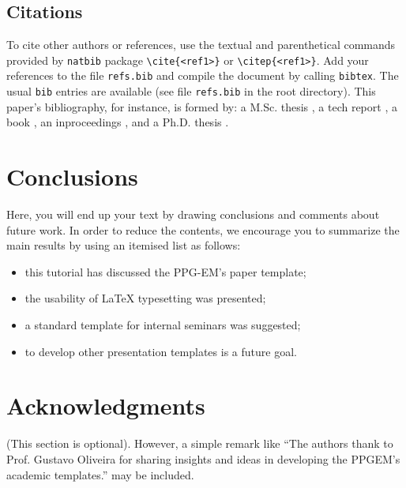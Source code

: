 \documentclass[date]{ppgem}
\begin{document}
\begin{multicols}{2}
\subsection{Citations}

To cite other authors or references, use the textual and parenthetical commands provided by \verb|natbib| package 
\verb|\cite{<ref1>}| or \verb|\citep{<ref1>}|. Add your references to the file \verb|refs.bib| and compile the document by calling \verb|bibtex|.
The usual \verb|bib| entries are available (see file \verb|refs.bib| in the root directory). This paper's bibliography, for instance, is formed by: a M.Sc. thesis \citep{rabellomsc2007}, a tech report \cite{amarante2001}, a book \citep{batchelor1994}, an inproceedings \cite{lima2009}, and a Ph.D. thesis \citep{loureirophd2008}.

\section{Conclusions}

Here, you will end up your text by drawing conclusions and comments about future work. In order to reduce the contents, we encourage you to summarize the main results by using an itemised list as follows:
\begin{itemize}
\item this tutorial has discussed the PPG-EM's paper template;
\item the usability of {\LaTeX} typesetting was presented;
\item a standard template for internal seminars was suggested;
\item to develop other presentation templates is a future goal. 
\end{itemize}

\section{Acknowledgments}

(This section is optional). However, a simple remark like ``The authors thank to Prof. Gustavo Oliveira for sharing insights and ideas in developing the PPGEM's academic templates.'' 
may be included. 




\end{multicols}
\end{document}
